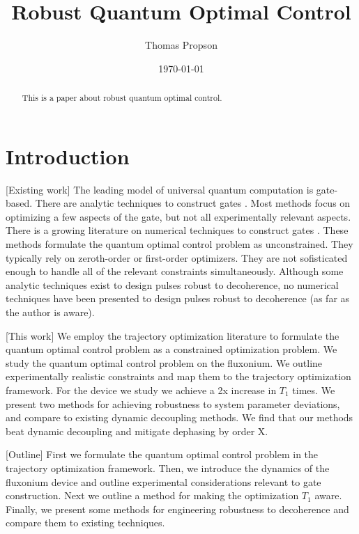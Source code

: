 \documentclass[
  amsfonts,
  amsmath,
  amssymb,
  aps,
  nobibnotes,
  prl,
  twocolumn,
]{revtex4-2}
\begin{document}
\title{Robust Quantum Optimal Control}

\author{Thomas Propson}

\date{\today}


\begin{abstract}
  This is a paper about robust quantum optimal control.
\end{abstract}

\maketitle


\section{Introduction}
[Existing work] The leading model of universal quantum computation is gate-based. There are analytic
techniques to construct gates \cite{huang2020engineering}
\cite{merrill2014progress} \cite{han2020experimental} \cite{wang2007nonadiabatic}.
Most methods focus on optimizing a few aspects of the gate, but not all
experimentally relevant aspects. There is a growing literature on numerical
techniques to construct gates \cite{leung2017speedup} \cite{abdelhafez2019gradient}.
These methods formulate the quantum optimal control problem as unconstrained.
They typically rely on zeroth-order or first-order optimizers. They are not
sofisticated enough to handle all of the relevant constraints simultaneously.
Although some analytic techniques exist to design pulses robust
to decoherence, no numerical techniques have been presented to
design pulses robust to decoherence (as far as the author is aware).

[This work] We employ the trajectory optimization literature to formulate the quantum
optimal control problem as a constrained optimization problem.
We study the quantum optimal control problem on the fluxonium.
We outline experimentally realistic constraints and map them to
the trajectory optimization framework. For the device we study
we achieve a 2x increase in $T_{1}$ times.
We present two methods for achieving robustness to system parameter deviations,
and compare to existing dynamic decoupling methods. We find that 
our methods beat dynamic decoupling and mitigate dephasing by order X.


[Outline]  First we formulate the quantum optimal control problem
in the trajectory optimization framework. Then, we introduce the dynamics
of the fluxonium device and outline experimental considerations
relevant to gate construction. Next we outline a method for
making the optimization $T_{1}$ aware. Finally, we present
some methods for engineering robustness to decoherence and
compare them to existing techniques.
\end{document}

